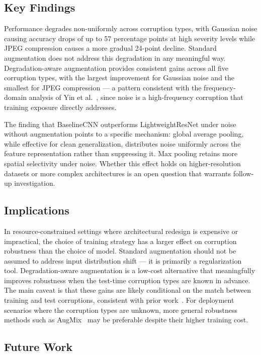 \documentclass[conference]{IEEEtran}
\begin{document}
\subsection{Key Findings}

Performance degrades non-uniformly across corruption types, with Gaussian noise causing accuracy drops of up to 57 percentage points at high severity levels while JPEG compression causes a more gradual 24-point decline. Standard augmentation does not address this degradation in any meaningful way. Degradation-aware augmentation provides consistent gains across all five corruption types, with the largest improvement for Gaussian noise and the smallest for JPEG compression --- a pattern consistent with the frequency-domain analysis of Yin et al.~\cite{yin2019}, since noise is a high-frequency corruption that training exposure directly addresses.

The finding that BaselineCNN outperforms LightweightResNet under noise without augmentation points to a specific mechanism: global average pooling, while effective for clean generalization, distributes noise uniformly across the feature representation rather than suppressing it. Max pooling retains more spatial selectivity under noise. Whether this effect holds on higher-resolution datasets or more complex architectures is an open question that warrants follow-up investigation.

\subsection{Implications}

In resource-constrained settings where architectural redesign is expensive or impractical, the choice of training strategy has a larger effect on corruption robustness than the choice of model. Standard augmentation should not be assumed to address input distribution shift --- it is primarily a regularization tool. Degradation-aware augmentation is a low-cost alternative that meaningfully improves robustness when the test-time corruption types are known in advance. The main caveat is that these gains are likely conditional on the match between training and test corruptions, consistent with prior work~\cite{mintun2021}. For deployment scenarios where the corruption types are unknown, more general robustness methods such as AugMix~\cite{hendrycks2020} may be preferable despite their higher training cost.

\subsection{Future Work}
\end{document}
